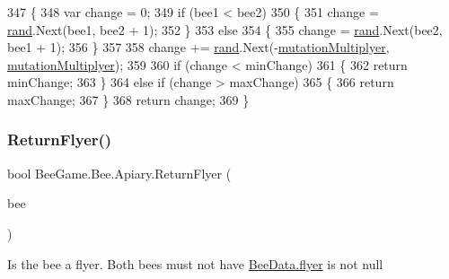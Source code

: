 \begin{DoxyCode}
347         \{
348             var change = 0;
349             \textcolor{keywordflow}{if} (bee1 < bee2)
350             \{
351                 change = \hyperlink{class_bee_game_1_1_bee_1_1_apiary_a272ac8b385ad3a7cd358b0959d561be7}{rand}.Next(bee1, bee2 + 1);
352             \}
353             \textcolor{keywordflow}{else}
354             \{
355                 change = \hyperlink{class_bee_game_1_1_bee_1_1_apiary_a272ac8b385ad3a7cd358b0959d561be7}{rand}.Next(bee2, bee1 + 1);
356             \}
357 
358             change += \hyperlink{class_bee_game_1_1_bee_1_1_apiary_a272ac8b385ad3a7cd358b0959d561be7}{rand}.Next(-\hyperlink{class_bee_game_1_1_bee_1_1_apiary_a0bdb20aaaa311091ddc2f4505dfdb17d}{mutationMultiplyer}, 
      \hyperlink{class_bee_game_1_1_bee_1_1_apiary_a0bdb20aaaa311091ddc2f4505dfdb17d}{mutationMultiplyer});
359 
360             \textcolor{keywordflow}{if} (change < minChange)
361             \{
362                 \textcolor{keywordflow}{return} minChange;
363             \}
364             \textcolor{keywordflow}{else} \textcolor{keywordflow}{if} (change > maxChange)
365             \{
366                 \textcolor{keywordflow}{return} maxChange;
367             \}
368             \textcolor{keywordflow}{return} change;
369         \}
\end{DoxyCode}
\mbox{\label{class_bee_game_1_1_bee_1_1_apiary_a3c794be5d19c1445f3a48ebc82d49980}} 
\subsubsection{\texorpdfstring{Return\+Flyer()}{ReturnFlyer()}}
{\footnotesize\ttfamily bool Bee\+Game.\+Bee.\+Apiary.\+Return\+Flyer (\begin{DoxyParamCaption}\item[{\hyperlink{struct_bee_game_1_1_bee_1_1_bee_data}{Bee\+Data}}]{bee }\end{DoxyParamCaption})\hspace{0.3cm}{\ttfamily [private]}}



Is the bee a flyer. Both bees must not have \hyperlink{struct_bee_game_1_1_bee_1_1_bee_data_af78a352321613693c3e94c98f655ac63}{Bee\+Data.\+flyer} is not null 


